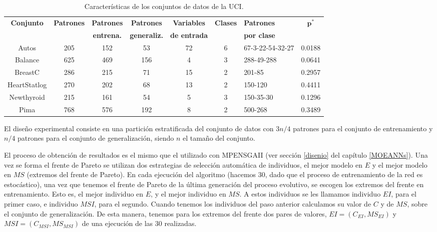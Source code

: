 \begin{table}[htb!]
\scriptsize
\caption{Características de los conjuntos de datos de la UCI.}
\label{tabla1MPDE}
\centering
\tabcolsep 1pt
\begin{tabular}{c c c c c c p{2.5cm} c}
\hline
\rowcolor[rgb]{0.70,0.85,1}\textbf{Conjunto} & \textbf{Patrones} &
\textbf{Patrones} & \textbf{Patrones} &
\textbf{Variables} & \textbf{Clases} &
\textbf{Patrones} & $\mathbf{p^{*}}$ \\
\rowcolor[rgb]{0.70,0.85,1} & & \textbf{entrena.} & \textbf{generaliz.} & \textbf{de
entrada} & & \textbf{por clase} & \\ \hline
\rowcolor[rgb]{0.86,0.94,1}Autos & 205 & 152 & 53 & 72 & 6 & 67-3-22-54-32-27 & 0.0188 \\
\rowcolor[rgb]{0.86,0.94,1}Balance & 625 & 469 & 156 & 4 & 3 & 288-49-288 & 0.0641 \\
\rowcolor[rgb]{0.86,0.94,1}BreastC & 286 & 215 & 71 & 15 & 2 & 201-85 & 0.2957 \\
\rowcolor[rgb]{0.86,0.94,1}HeartStatlog & 270 & 202 & 68 & 13 & 2 & 150-120 & 0.4411 \\
\rowcolor[rgb]{0.86,0.94,1}Newthyroid & 215 & 161 & 54 & 5 & 3 & 150-35-30 & 0.1296 \\
\rowcolor[rgb]{0.86,0.94,1}Pima & 768 & 576 & 192 & 8 & 2 & 500-268 & 0.3489 \\ \hline
\end{tabular}
\end{table}

El diseño experimental consiste en una partición estratificada del conjunto de datos con $3n/4$
patrones para
el conjunto de entrenamiento y $n/4$ patrones para el conjunto de generalización, siendo $n$ el
tamaño del conjunto.

El proceso de obtención de resultados es el mismo que el utilizado con MPENSGAII (ver
sección \ref{disenio} del capítulo \ref{MOEANNs}). Una vez se forma el frente de Pareto
se utilizan dos estrategias de selección
automática de individuos, el mejor modelo en $E$ y el mejor modelo en $MS$
(extremos del frente de Pareto). En cada ejecución del algoritmo (hacemos 30, dado que el proceso
de entrenamiento de la red es estocástico), una vez que tenemos el frente de Pareto de la última
generación del proceso evolutivo, se escogen los
extremos del frente en entrenamiento. Esto es, el mejor individuo en $E$, y el
mejor individuo en $MS$. A estos individuos se les llamamos individuo
$EI$, para el primer caso, e individuo $MSI$, para el segundo. Cuando tenemos los
individuos del paso anterior calculamos su valor de $C$ y de $MS$, sobre el conjunto
de generalización. De esta manera, tenemos para los extremos del frente dos pares de valores,
$\displaystyle EI=(C_{EI},MS_{EI})$ y $\displaystyle MSI=(C_{MSI},MS_{MSI})$ de una ejecución de las
30 realizadas.

